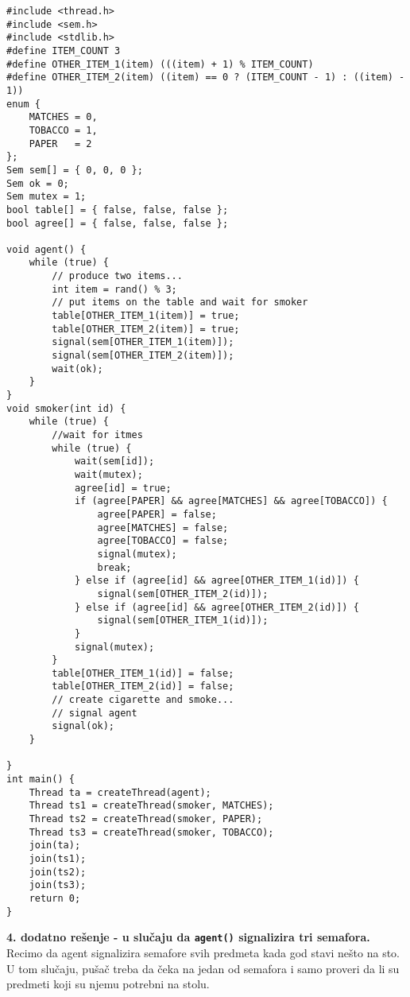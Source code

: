\begin{lstlisting}
#include <thread.h>
#include <sem.h>
#include <stdlib.h>
#define ITEM_COUNT 3
#define OTHER_ITEM_1(item) (((item) + 1) % ITEM_COUNT)
#define OTHER_ITEM_2(item) ((item) == 0 ? (ITEM_COUNT - 1) : ((item) - 1))
enum {
    MATCHES = 0,
    TOBACCO = 1,
    PAPER   = 2
};
Sem sem[] = { 0, 0, 0 };
Sem ok = 0;
Sem mutex = 1;
bool table[] = { false, false, false };
bool agree[] = { false, false, false };

void agent() {
    while (true) {
        // produce two items...
        int item = rand() % 3;
        // put items on the table and wait for smoker
        table[OTHER_ITEM_1(item)] = true;
        table[OTHER_ITEM_2(item)] = true;
        signal(sem[OTHER_ITEM_1(item)]);
        signal(sem[OTHER_ITEM_2(item)]);
        wait(ok);
    }
}
void smoker(int id) {
    while (true) {
        //wait for itmes
        while (true) {
            wait(sem[id]);
            wait(mutex);
            agree[id] = true;
            if (agree[PAPER] && agree[MATCHES] && agree[TOBACCO]) {
                agree[PAPER] = false;
                agree[MATCHES] = false;
                agree[TOBACCO] = false;
                signal(mutex);
                break;
            } else if (agree[id] && agree[OTHER_ITEM_1(id)]) {
                signal(sem[OTHER_ITEM_2(id)]);
            } else if (agree[id] && agree[OTHER_ITEM_2(id)]) {
                signal(sem[OTHER_ITEM_1(id)]);
            }
            signal(mutex);
        }
        table[OTHER_ITEM_1(id)] = false;
        table[OTHER_ITEM_2(id)] = false;
        // create cigarette and smoke...
        // signal agent
        signal(ok);
    }
    
}
int main() {
    Thread ta = createThread(agent);
    Thread ts1 = createThread(smoker, MATCHES);
    Thread ts2 = createThread(smoker, PAPER);
    Thread ts3 = createThread(smoker, TOBACCO);
    join(ta);
    join(ts1);
    join(ts2);
    join(ts3);
    return 0;
}

\end{lstlisting}
\textbf{\large 4. dodatno re\v{s}enje - u slu\v{c}aju da \texttt{agent()} signalizira tri semafora.}\\
Recimo da agent signalizira semafore svih predmeta kada god stavi ne\v{s}to na sto. U tom slu\v{c}aju, pu\v{s}a\v{c} treba da \v{c}eka na jedan od semafora i samo proveri da li su predmeti koji su njemu potrebni na stolu.
